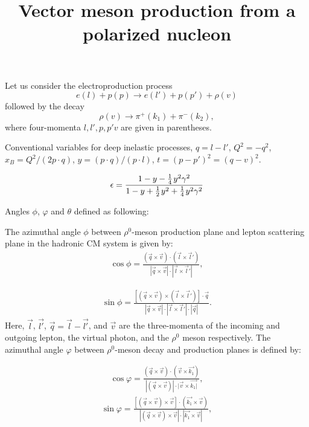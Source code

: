 \documentclass[12pt]{article}
\title{Vector meson production from a polarized nucleon}
\newcommand{\ms}{\mskip 1.5mu}
\newcommand{\0}{{\mskip 2.5mu} 0 {\mskip 2.5mu}}
\begin{document}
Let us consider the electroproduction process
\begin{equation}
  \label{production}
e(l) + p(p) \to e(l') + p(p') + \rho(v) 
\end{equation}
followed by the decay
\begin{equation}
  \label{decay}
\rho(v) \to \pi^+(k_1) + \pi^-(k_2) ,
\end{equation}
where four-momenta $l, l', p, p' v$ are given in parentheses.  


Conventional variables for deep
inelastic processes, $q=l-l'$, $Q^2= -q^2$, $x_B= Q^2 /(2 p\cdot q)$,
$y=(p\cdot q) /(p\cdot l)$, $t=(p-p')^2=(q-v)^2$.  

\begin{equation}
  \label{eps-def}
\epsilon
  = \frac{1 - y - \frac{1}{4}\ms y^2 \gamma^2}{
          1 - y + \frac{1}{2}\ms y^2 + \frac{1}{4}\ms y^2 \gamma^2}
\end{equation}


Angles  $\phi$, $\varphi$ and $\theta$  defined as following:

The azimuthal angle $\phi$ between $\rho^0$-meson production plane and lepton scattering plane in the hadronic CM system is given by:
\begin{eqnarray}
\cos \phi = \frac{ (\vec{q} \times \vec{v}) \cdot (\vec{l} \times \vec{l}')}
{ | \vec{q} \times \vec{v} | \cdot |\vec{l} \times \vec{l}'| } ,
\label{phicap1-def}
\end{eqnarray}

\begin{eqnarray}
\sin \phi =
 \frac{ [ (\vec{q} \times \vec{v} )\times (\vec{l} \times \vec{l}' )] \cdot \vec{q} }
 { |\vec{q} \times \vec{v}| \cdot |\vec{l} \times \vec{l}'| \cdot |\vec{q}|
 }.
\label{phicap2-def}
\end{eqnarray}
Here,  $\vec{l}$, $\vec{l'}$, $\vec{q}=\vec{l}-\vec{l'}$, and $\vec{v}$  are the three-momenta of the incoming  and outgoing lepton, the virtual photon, and the $\rho^0 $ meson respectively.
%
The azimuthal angle $\varphi $ between $\rho^0$-meson decay and production planes is defined by:

\begin{eqnarray}
\cos \varphi =
\frac{ (\vec{q} \times \vec{v} )\cdot (\vec{v} \times \vec{k_1} ) }
{ | (\vec{q} \times \vec{v} ) |
\cdot |\vec{v} \times \vec{k_1 |}} ,
\label{phismall1-def}
\end{eqnarray}
\begin{eqnarray}
 \sin \varphi =
 \frac{[ (\vec{q} \times \vec{v} )\times \vec{v} ] \cdot ( \vec{k_1}  \times \vec{v} ) }
{ | (\vec{q} \times \vec{v} )\times \vec{v} | \cdot |\vec{k_1} \times \vec{v} |
 } ,
\label{phismall2-def}
\end{eqnarray}
\end{document}
